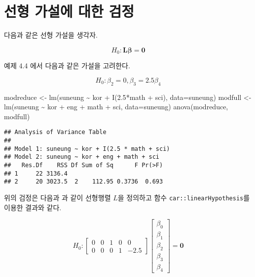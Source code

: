 \documentclass[
]{book}
\newenvironment{Shaded}{\begin{snugshade}}{\end{snugshade}}
\newcommand{\AttributeTok}[1]{\textcolor[rgb]{0.77,0.63,0.00}{#1}}
\newcommand{\FloatTok}[1]{\textcolor[rgb]{0.00,0.00,0.81}{#1}}
\newcommand{\FunctionTok}[1]{\textcolor[rgb]{0.00,0.00,0.00}{#1}}
\newcommand{\NormalTok}[1]{#1}
\newcommand{\OtherTok}[1]{\textcolor[rgb]{0.56,0.35,0.01}{#1}}
\newcommand{\SpecialCharTok}[1]{\textcolor[rgb]{0.00,0.00,0.00}{#1}}
\begin{document}
\hypertarget{uxc120uxd615-uxac00uxc124uxc5d0-uxb300uxd55c-uxac80uxc815}{%
\section{선형 가설에 대한 검정}\label{uxc120uxd615-uxac00uxc124uxc5d0-uxb300uxd55c-uxac80uxc815}}

다음과 같은 선형 가설을 생각자.

\[ H_0: \bm L \bm \beta= \bm 0\]

예제 4.4 에서 다음과 같은 가설을 고려한다.

\[ H_0: \beta_2=0, \beta_3= 2.5 \beta_4 \]

\begin{Shaded}
\begin{Highlighting}[]
\NormalTok{modreduce }\OtherTok{\textless{}{-}} \FunctionTok{lm}\NormalTok{(suneung }\SpecialCharTok{\textasciitilde{}}\NormalTok{ kor }\SpecialCharTok{+} \FunctionTok{I}\NormalTok{(}\FloatTok{2.5}\SpecialCharTok{*}\NormalTok{math }\SpecialCharTok{+}\NormalTok{ sci), }\AttributeTok{data=}\NormalTok{suneung)}
\NormalTok{modfull }\OtherTok{\textless{}{-}} \FunctionTok{lm}\NormalTok{(suneung }\SpecialCharTok{\textasciitilde{}}\NormalTok{ kor }\SpecialCharTok{+}\NormalTok{ eng }\SpecialCharTok{+}\NormalTok{ math }\SpecialCharTok{+}\NormalTok{ sci, }\AttributeTok{data=}\NormalTok{suneung)}
\FunctionTok{anova}\NormalTok{(modreduce, modfull)}
\end{Highlighting}
\end{Shaded}

\begin{verbatim}
## Analysis of Variance Table
## 
## Model 1: suneung ~ kor + I(2.5 * math + sci)
## Model 2: suneung ~ kor + eng + math + sci
##   Res.Df    RSS Df Sum of Sq      F Pr(>F)
## 1     22 3136.4                           
## 2     20 3023.5  2    112.95 0.3736  0.693
\end{verbatim}

위의 검정은 다음과 과 같이 선형행렬 \(L\)을 정의하고 함수 \texttt{car::linearHypothesis}를 이용한 결과와 같다.

\[
H_0: 
\begin{bmatrix}
0 & 0  & 1 & 0 & 0  \\
0 & 0  & 0 & 1 &-2.5 
\end{bmatrix}
\begin{bmatrix}
\beta_0 \\
\beta_1 \\
\beta_2 \\
\beta_3 \\
\beta_4 
\end{bmatrix}
=\bm 0
\]
\end{document}
